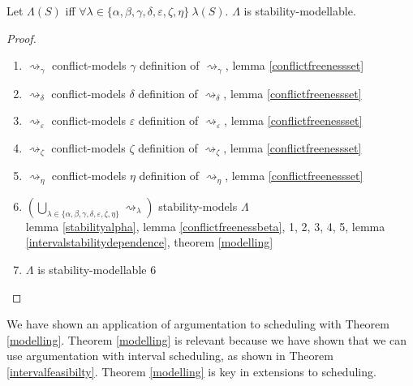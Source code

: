 \begin{theorem}
	\label{intervalfeasibilty}
	
	Let $\Lambda(S)$ iff $\forall\lambda\in\{\alpha,\beta,\gamma,\delta,\varepsilon,\zeta,\eta\}\ \lambda(S)$. $\Lambda$ is stability-modellable.
	
	\begin{proof}\ 
		\begin{enumerate}
			\item $\rightsquigarrow_\gamma$ conflict-models $\gamma$ \hfill definition of $\rightsquigarrow_\gamma$, lemma \ref{conflictfreenessset}
			\item $\rightsquigarrow_\delta$ conflict-models $\delta$ \hfill definition of $\rightsquigarrow_\delta$, lemma \ref{conflictfreenessset}
			\item $\rightsquigarrow_\varepsilon$ conflict-models $\varepsilon$ \hfill definition of $\rightsquigarrow_\varepsilon$, lemma \ref{conflictfreenessset}
			\item $\rightsquigarrow_\zeta$ conflict-models $\zeta$ \hfill definition of $\rightsquigarrow_\zeta$, lemma \ref{conflictfreenessset}
			\item $\rightsquigarrow_\eta$ conflict-models $\eta$ \hfill definition of $\rightsquigarrow_\eta$, lemma \ref{conflictfreenessset}
			\item $\left(\bigcup_{\lambda\in\{\alpha,\beta,\gamma,\delta,\varepsilon,\zeta,\eta\}}\rightsquigarrow_\lambda\right)$ stability-models $\Lambda$\\\indent\hfill lemma \ref{stabilityalpha}, lemma \ref{conflictfreenessbeta}, 1, 2, 3, 4, 5, lemma \ref{intervalstabilitydependence}, theorem \ref{modelling}
			\item $\Lambda$ is stability-modellable \hfill 6
		\end{enumerate}
	\end{proof}
\end{theorem}

We have shown an application of argumentation to scheduling with Theorem \ref{modelling}. Theorem \ref{modelling} is relevant because we have shown that we can use argumentation with interval scheduling, as shown in Theorem \ref{intervalfeasibilty}. Theorem \ref{modelling} is key in extensions to scheduling.